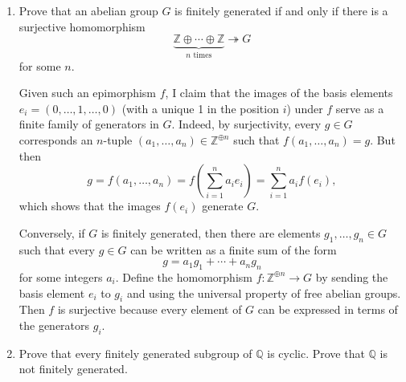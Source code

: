 \begin{enumerate}
    \item Prove that an abelian group $G$ is finitely generated if and only if there is a surjective homomorphism
      \[
      \underbrace{\mathbb{Z} \oplus \cdots \oplus \mathbb{Z}}_{\text{$n$ times}}
      \twoheadrightarrow G
      \]
      for some $n$.
\begin{solution}
      Given such an epimorphism $f$, I claim that the images of the basis elements $e_i = (0,\ldots,1,\ldots,0)$ (with a unique 1 in the position $i$) under $f$ serve as a finite family of generators in $G$. Indeed, by surjectivity, every $g \in G$ corresponds an $n$-tuple $(a_1, \ldots, a_n) \in \mathbb{Z}^{\oplus n}$ such that $f(a_1, \ldots, a_n) = g$. But then \[ g = f(a_1, \ldots, a_n) = f\left(\sum_{i=1}^n a_i e_i\right) = \sum_{i=1}^n a_i f(e_i), \]
which shows that the images $f(e_i)$ generate $G$.

Conversely, if $G$ is finitely generated, then there are elements $g_1, \ldots, g_n \in G$ such that every $g \in G$ can be written as a finite sum of the form \[ g = a_1 g_1 + \cdots + a_n g_n \] for some integers $a_i$. Define the homomorphism $f: \mathbb{Z}^{\oplus n} \to G$ by sending the basis element $e_i$ to $g_i$ and using the universal property of free abelian groups. Then $f$ is surjective because every element of $G$ can be expressed in terms of the generators $g_i$.
\end{solution}

    \item Prove that every finitely generated subgroup of $\mathbb{Q}$ is cyclic. Prove that $\mathbb{Q}$ is not finitely generated.


\end{enumerate}
